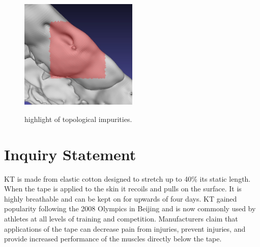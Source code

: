 \documentclass[letterpaper, 12 pt, conference]{ieeeconf}  %
\begin{document}
\begin{figure}[h!]
  \caption{highlight of topological impurities.}
  \centering
    \includegraphics[width=0.5\textwidth]{images/loop_example.jpg}
    \label{fig:loop}
\end{figure}

\maketitle
\thispagestyle{empty}
\pagestyle{empty}

















































\section{Inquiry Statement}  

 \ac{KT} is made from elastic cotton designed to stretch up to 40\% its static length. When the tape is applied to the skin it recoils and pulls on the surface. It is highly breathable and can be kept on for upwards of four days. \ac{KT} gained popularity following the 2008 Olympics in Beijing and is now commonly used by athletes at all levels of training and competition.   Manufacturers claim that applications of the tape can decrease pain from injuries, prevent injuries, and provide increased performance of the muscles directly below the tape.     
\end{document}
